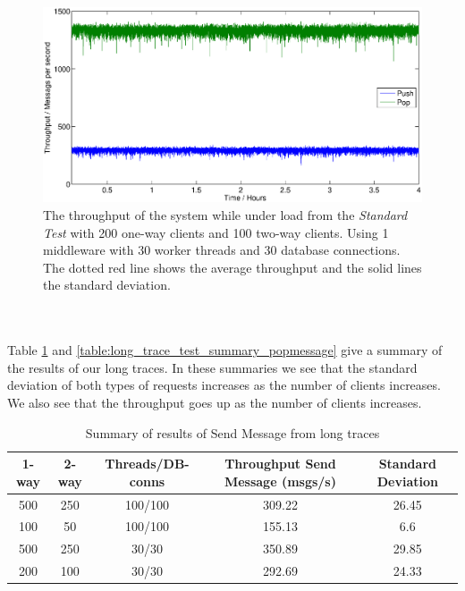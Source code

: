 \documentclass{article}
\begin{document}
            \begin{figure}[H]
                \hspace{-4.5cm}
                \includegraphics[scale=0.750]{4h_throughput}
                \caption{The throughput of the system while under load from the \textit{Standard Test} with 200 one-way clients and 100 two-way clients. Using 1 middleware with 30 worker threads and 30 database connections. The dotted red line shows the average throughput and the solid lines the standard deviation.}
                \label{fig:4h_throughput}
            \end{figure}
            ~\\
            ~\\
            Table \ref{table:long_trace_test_summary_sendmessage} and \ref{table:long_trace_test_summary_popmessage} give a summary of the results of our long traces. In these summaries we see that the standard deviation of both types of requests increases as the number of clients increases. We also see that the throughput goes up as the number of clients increases.

            \begin{table}[H]
                \caption{Summary of results of Send Message from long traces}
                \label{table:long_trace_test_summary_sendmessage}
                    \begin{tabular}{|c|c|c|c|c|}
                        \hline 
                        \textbf{1-way} & \textbf{2-way} & \textbf{Threads/DB-conns} & \textbf{Throughput Send Message (msgs/s)} & \textbf{Standard Deviation}\\ 
                        \hline 
                        500 & 250 & 100/100 &309.22 &26.45\\
                        \hline
                        100 & 50 & 100/100 &155.13 &6.6\\
                        \hline 
                        500 & 250 & 30/30 &350.89 &29.85\\
                        \hline
                        200 & 100 & 30/30 &292.69 &24.33\\
                        \hline
                    \end{tabular} 
            \end{table}
\end{document}

